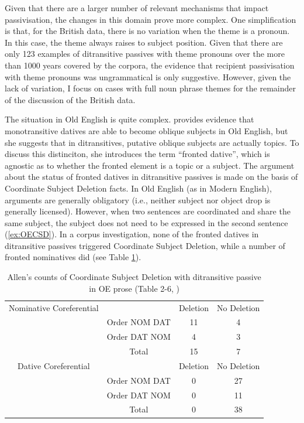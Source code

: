 	Given that there are a larger number of relevant mechanisms that impact passivisation, the changes in this domain prove more complex. One simplification is that, for the British data, there is no variation when the theme is a pronoun. In this case, the theme always raises to subject position. Given that there are only 123 examples of ditransitive passives with theme pronouns over the more than 1000 years covered by the corpora, the evidence that recipient passivisation with theme pronouns was ungrammatical is only suggestive. However, given the lack of variation, I focus on cases with full noun phrase themes for the remainder of the discussion of the British data.
	
	The situation in Old English is quite complex. \cite{Allen.1999} provides evidence that monotransitive datives are able to become oblique subjects in Old English, but she suggests that in ditransitives, putative oblique subjects are actually topics. To discuss this distinciton, she introduces the term ``fronted dative'', which is agnostic as to whether the fronted element is a topic or a subject. The argument about the status of fronted datives in ditransitive passives is made on the basis of Coordinate Subject Deletion facts. In Old English (as in Modern English), arguments are generally obligatory (i.e., neither subject nor object drop is generally licensed). However, when two sentences are coordinated and share the same subject, the subject does not need to be expressed in the second sentence (\ref{ex:OECSD}). In a corpus investigation, none of the fronted datives in ditransitive passives triggered Coordinate Subject Deletion, while a number of fronted nominatives did (see Table \ref{tab:AllenOECSD}). 

	\begin{table}[t]
		\begin{tabular}{cccc}
			Nominative Coreferential & & Deletion & No Deletion \\
			& Order NOM DAT & 11 & 4 \\
			& Order DAT NOM & 4 & 3 \\
			& Total & 15 & 7 \\
			\hline
			Dative Coreferential & & Deletion & No Deletion \\
			& Order NOM DAT & 0 & 27 \\
			& Order DAT NOM & 0 & 11 \\
			& Total & 0 & 38 \\
		\end{tabular}
		\caption{Allen's counts of Coordinate Subject Deletion with ditransitive passive in OE prose (Table 2-6, \citealt{Allen.1999})}
		\label{tab:AllenOECSD}
	\end{table}

